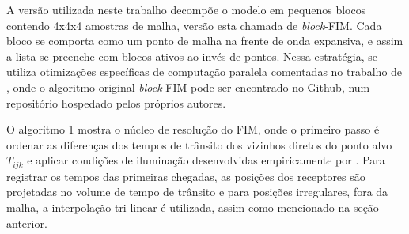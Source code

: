 A versão utilizada neste trabalho decompõe o modelo em pequenos blocos contendo 4x4x4 amostras de malha, versão esta chamada de \textit{block}-FIM. Cada bloco se comporta como um ponto de malha na frente de onda expansiva, e assim a lista se preenche com blocos ativos ao invés de pontos. Nessa estratégia, se utiliza otimizações específicas de computação paralela comentadas no trabalho de , onde o algoritmo original \textit{block}-FIM pode ser encontrado no Github, num repositório hospedado pelos próprios autores.


O algoritmo 1 mostra o núcleo de resolução do FIM, onde o primeiro passo é ordenar as diferenças dos tempos de trânsito dos vizinhos diretos do ponto alvo $T_{ijk}$ e aplicar condições de iluminação desenvolvidas empiricamente por . Para registrar os tempos das primeiras chegadas, as posições dos receptores são projetadas no volume de tempo de trânsito e para posições irregulares, fora da malha, a interpolação tri linear é utilizada, assim como mencionado na seção anterior.  

